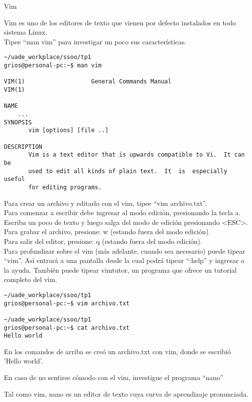\begin{section}{Vim}

\begin{quoting}
Vim es uno de los editores de texto que vienen por defecto instalados en todo sistema Linux.\\
Tipee “man vim” para investigar un poco sus características.\end{quoting}
\begin{lstlisting}[style=Ubuntu]
~/uade_workplace/ssoo/tp1
grios@personal-pc:~$ man vim

VIM(1)                   General Commands Manual                  VIM(1)

NAME
	...
SYNOPSIS
       vim [options] [file ..]

DESCRIPTION
       Vim is a text editor that is upwards compatible to Vi.  It can be
       used to edit all kinds of plain text.  It  is  especially  useful
       for editing programs.

\end{lstlisting}

\begin{quoting}
Para crear un archivo y editarlo con el vim, tipee “vim archivo.txt”. \\
Para comenzar a escribir debe ingresar al modo edición, presionando la tecla a. Escriba un poco de
texto y luego salga del modo de edición presionando <ESC>.\\
Para grabar el archivo, presione: w (estando fuera del modo edición).\\
Para salir del editor, presione: q (estando fuera del modo edición).\\
Para profundizar sobre el vim (más adelante, cuando sea necesario) puede tipear “vim”. Así entrará a
una pantalla desde la cual podrá tipear “:help” y ingresar a la ayuda. También puede tipear vimtutor, un
programa que ofrece un tutorial completo del vim.
\end{quoting}

\begin{lstlisting}[style=Ubuntu]
~/uade_workplace/ssoo/tp1
grios@personal-pc:~$ vim archivo.txt

~/uade_workplace/ssoo/tp1
grios@personal-pc:~$ cat archivo.txt 
Hello world

\end{lstlisting}

En los comandos de arriba se creó un archivo.txt con vim, donde se escribió 'Hello world'. \\

\begin{quoting}
En caso de no sentirse cómodo con el vim, investigue el programa “nano”
\end{quoting}

Tal como vim, nano es un editor de texto cuya curva de aprendizaje pronunciada.

\end{section}